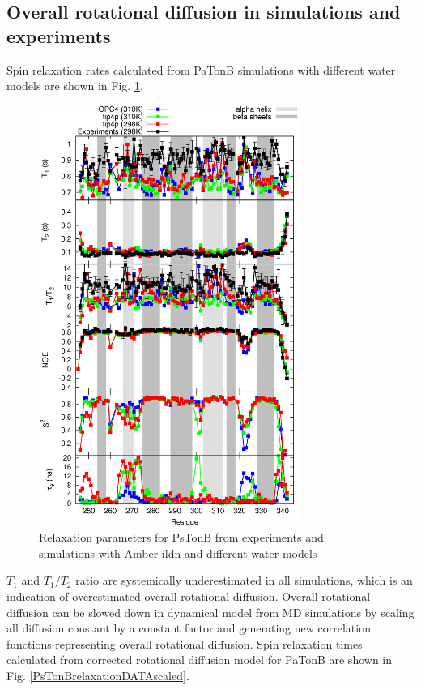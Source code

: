 \documentclass[pre,aps,floatfix,authordate1-4,twocolumn]{revtex4-1}
\begin{document}
\subsection{Overall rotational diffusion in simulations and experiments}
Spin relaxation rates calculated from PaTonB simulations with different
water models are shown in Fig. \ref{PsTonBrelaxationDATA}.
\begin{figure}[!h]
  \includegraphics[width=8.5cm]{../Figs/PsTonBrelaxationDATA.eps}%
  \caption{Relaxation parameters for PsTonB from
    experiments and simulations with Amber-ildn and different water models
    \label{PsTonBrelaxationDATA}}%
\end{figure}
$T_1$ and $T_1/T_2$ ratio are systemically underestimated in all simulations,
which is an indication of overestimated overall rotational diffusion.
Overall rotational diffusion can be slowed down in dynamical model from MD simulations
by scaling all diffusion constant by a constant factor and generating new
correlation functions representing overall rotational diffusion. 
Spin relaxation times calculated from corrected rotational diffusion model
for PaTonB are shown in Fig. \ref{PsTonBrelaxationDATAscaled}.
\end{document}

